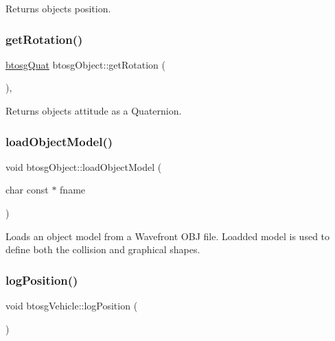 Returns object\textquotesingle{}s position. \mbox{\label{classbtosgObject_a3b825999ad3a51bde743d4085ff19dae}} 
\subsubsection{\texorpdfstring{get\+Rotation()}{getRotation()}}
{\footnotesize\ttfamily \hyperlink{classbtosgQuat}{btosg\+Quat} btosg\+Object\+::get\+Rotation (\begin{DoxyParamCaption}{ }\end{DoxyParamCaption})\hspace{0.3cm}{\ttfamily [inline]}, {\ttfamily [inherited]}}

Returns object\textquotesingle{}s attitude as a Quaternion. \mbox{\label{classbtosgObject_a91838b8235579da178fcc06e6d3d47f3}} 
\subsubsection{\texorpdfstring{load\+Object\+Model()}{loadObjectModel()}}
{\footnotesize\ttfamily void btosg\+Object\+::load\+Object\+Model (\begin{DoxyParamCaption}\item[{char const $\ast$}]{fname }\end{DoxyParamCaption})\hspace{0.3cm}{\ttfamily [inherited]}}

Loads an object model from a Wavefront O\+BJ file. Loadded model is used to define both the collision and graphical shapes. \mbox{\label{classbtosgVehicle_ae9168c62263b26f95d068d94d6a7cab7}} 
\subsubsection{\texorpdfstring{log\+Position()}{logPosition()}}
{\footnotesize\ttfamily void btosg\+Vehicle\+::log\+Position (\begin{DoxyParamCaption}{ }\end{DoxyParamCaption})\hspace{0.3cm}{\ttfamily [inline]}}

